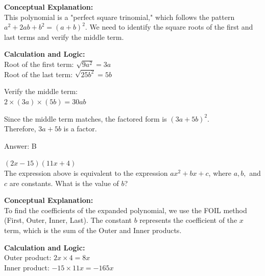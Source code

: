 \documentclass[11pt,paper=a4,answers]{exam}
\begin{document}
\begin{questions}
\begin{solution}
\textbf{Conceptual Explanation:} \\
This polynomial is a "perfect square trinomial," which follows the pattern $a^2 + 2ab + b^2 = (a + b)^2$. We need to identify the square roots of the first and last terms and verify the middle term.

\vspace{20pt}

\textbf{Calculation and Logic:} \\
Root of the first term: $\sqrt{9a^2} = 3a$ \\
Root of the last term: $\sqrt{25b^2} = 5b$

\vspace{10pt}

Verify the middle term: \\
$2 \times (3a) \times (5b) = 30ab$

\vspace{10pt}

Since the middle term matches, the factored form is $(3a + 5b)^2$. \\
Therefore, $3a + 5b$ is a factor.

\vspace{25pt}

Answer: \colorbox{yellow!100}{B}
\end{solution}

\vspace{40pt}

\question
$(2x - 15)(11x + 4)$ \\
The expression above is equivalent to the expression $ax^2 + bx + c$, where $a, b,$ and $c$ are constants. What is the value of $b$?

\begin{solution}
\textbf{Conceptual Explanation:} \\
To find the coefficients of the expanded polynomial, we use the FOIL method (First, Outer, Inner, Last). The constant $b$ represents the coefficient of the $x$ term, which is the sum of the Outer and Inner products.

\vspace{20pt}

\textbf{Calculation and Logic:} \\
Outer product: $2x \times 4 = 8x$ \\
Inner product: $-15 \times 11x = -165x$


\end{solution}
\end{questions}
\end{document}
